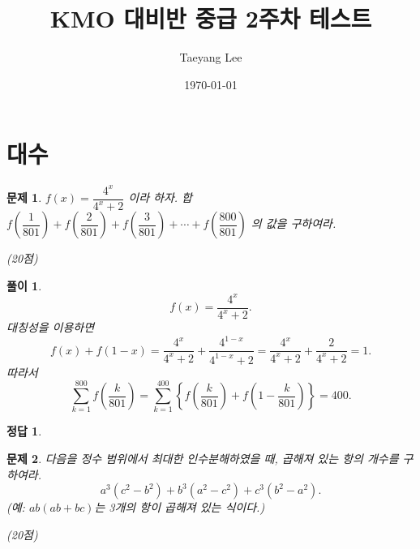 \documentclass[12pt,a4paper]{article}
\title{KMO 대비반 중급 2주차 테스트}
\author{Taeyang Lee}
\date{\today}
\theoremstyle{test_form}
\newtheorem{problem}{문제}[section]
\newtheorem*{solution}{풀이}
\newtheorem*{answer}{정답}
\begin{document}
\maketitle
\tableofcontents  %

\newpage

\section{대수}

\begin{problem}
    
    $f(x) = \dfrac{4^x}{4^x+2}$ 이라 하자. 
    합 
    $f\!\left(\dfrac{1}{801}\right) + f\!\left(\dfrac{2}{801}\right) + f\!\left(\dfrac{3}{801}\right) + \cdots + f\!\left(\dfrac{800}{801}\right)$
    의 값을 구하여라.
    \begin{flushright}(20점)\end{flushright}
    
\end{problem}

\begin{solution}
\[
f(x)=\frac{4^x}{4^x+2}.
\]
대칭성을 이용하면
\[
f(x)+f(1-x)=\frac{4^x}{4^x+2}+\frac{4^{1-x}}{4^{1-x}+2}
=\frac{4^x}{4^x+2}+\frac{2}{4^x+2}=1.
\]
따라서
\[
\sum_{k=1}^{800} f\!\left(\frac{k}{801}\right)
=\sum_{k=1}^{400}\left\{f\!\left(\frac{k}{801}\right)
+f\!\left(1-\frac{k}{801}\right)\right\}
=400.
\]
\end{solution}

\begin{answer}
\hfill {}
\end{answer}

\newpage

\begin{problem}
다음을 정수 범위에서 최대한 인수분해하였을 때, 곱해져 있는 항의 개수를 구하여라.
\[
a^{3}(c^{2}-b^{2})+b^{3}(a^{2}-c^{2})+c^{3}(b^{2}-a^{2}).
\]
(예: \(ab(ab+bc)\)는 3개의 항이 곱해져 있는 식이다.)
\begin{flushright}(20점)\end{flushright}
\end{problem}
\end{document}
